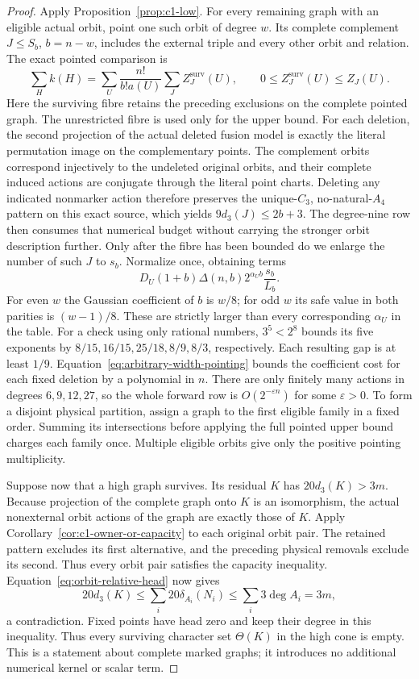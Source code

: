 \begin{proof}
Apply Proposition~\ref{prop:c1-low}. For every remaining graph
with an eligible actual orbit, point one such orbit of degree $w$.
Its complete complement $J\leq S_b$, $b=n-w$, includes the external
triple and every other orbit and relation. The exact pointed
comparison is
\[
 \sum_H k(H)=\sum_U\frac{n!}{b!a(U)}
                    \sum_J Z^{\mathrm{surv}}_J(U),
 \qquad 0\leq Z^{\mathrm{surv}}_J(U)\leq Z_J(U).
\]
Here the surviving fibre retains the preceding exclusions on the complete
pointed graph. The unrestricted fibre is used only for the upper bound.
For each deletion, the second projection of the actual deleted fusion model
is exactly the literal permutation image on the complementary points.  The
complement orbits correspond injectively to the undeleted original orbits,
and their complete induced actions are conjugate through the literal point
charts.  Deleting any indicated nonmarker action therefore preserves the
unique-$C_3$, no-natural-$A_4$ pattern on this exact source, which yields
$9d_3(J)\leq2b+3$.  The degree-nine row then consumes that numerical budget
without carrying the stronger orbit description further.  Only after the
fibre has been bounded do we enlarge the number of such $J$ to $s_b$.
Normalize once, obtaining terms
\[
 D_U(1+b)\Delta(n,b)2^{\alpha_Ub}\frac{s_b}{L_b}.
\]
For even $w$ the Gaussian coefficient of $b$ is $w/8$; for odd
$w$ its safe value in both parities is $(w-1)/8$. These are strictly
larger than every corresponding $\alpha_U$ in the table. For a check
using only rational numbers, $3^5<2^8$ bounds its five exponents by
$8/15,16/15,25/18,8/9,8/3$, respectively. Each resulting gap is at
least $1/9$. Equation~\eqref{eq:arbitrary-width-pointing} bounds the
coefficient cost for each fixed deletion by a polynomial in $n$.
There are only finitely
many actions in degrees $6,9,12,27$, so the whole forward row is
$O(2^{-\varepsilon n})$ for some $\varepsilon>0$. To form a
disjoint physical partition, assign a graph to the first eligible
family in a fixed order. Summing its intersections before applying
the full pointed upper bound charges each family once. Multiple
eligible orbits give only the positive pointing multiplicity.

Suppose now that a high graph survives. Its residual $K$ has
$20d_3(K)>3m$. Because projection of the complete graph onto $K$
is an isomorphism, the actual nonexternal orbit actions of the graph
are exactly those of $K$. Apply
Corollary~\ref{cor:c1-owner-or-capacity} to each original orbit pair.
The retained pattern excludes its first alternative, and the preceding
physical removals exclude its second.  Thus every orbit pair satisfies
the capacity inequality.  Equation~\eqref{eq:orbit-relative-head} now
gives
\[
 20d_3(K)\leq\sum_i20\delta_{A_i}(N_i)
       \leq\sum_i3\deg A_i=3m,
\]
a contradiction. Fixed points have head zero and keep their degree
in this inequality. Thus every surviving character set
$\Theta(K)$ in the high cone is empty. This is a statement about
complete marked graphs; it introduces no additional numerical
kernel or scalar term.
\end{proof}

